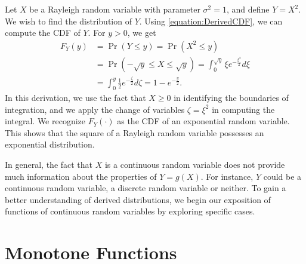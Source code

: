 \begin{example} \label{example:RayleighExponentialRV}
Let $X$ be a Rayleigh  random variable with parameter $\sigma^2  = 1$, and define $Y = X^2$.
We wish to find the distribution of $Y$.
Using \eqref{equation:DerivedCDF}, we can compute the CDF of $Y$.
For $y > 0$, we get
\begin{equation*}
\begin{split}
F_Y(y) &= \Pr (Y \leq y) = \Pr \left( X^2 \leq y \right) \\
&= \Pr (- \sqrt{y} \leq X \leq \sqrt{y})
= \int_0^{\sqrt{y}} \xi e^{- \frac{\xi^2}{2}} d\xi \\
&= \int_0^{y} \frac{1}{2} e^{- \frac{\zeta}{2}} d\zeta
= 1 - e^{-\frac{y}{2}} .
\end{split}
\end{equation*}
In this derivation, we use the fact that $X \geq 0$ in identifying the boundaries of integration, and we apply the change of variables $\zeta = \xi^2$ in computing the integral.
We recognize $F_Y(\cdot)$ as the CDF of an exponential random variable.
This shows that the square of a Rayleigh random variable possesses an exponential distribution.
\end{example}

In general, the fact that $X$ is a continuous random variable does not provide much information about the properties of $Y = g(X)$.
For instance, $Y$ could be a continuous random variable, a discrete random variable or neither.
To gain a better understanding of derived distributions, we begin our exposition of functions of continuous random variables by exploring specific cases.


\section{Monotone Functions}


